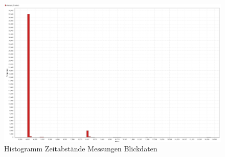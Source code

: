 \begin{figure}[H]
	\noindent \begin{centering}
		\includegraphics[width=15cm]{pics/HistogrammZeitenBlickdateien.png}
		\par\end{centering}
	\caption{\label{fig:HistogrammZeitenBlickdateien}Histogramm Zeitabst\"ande Messungen Blickdaten \cite{BilderExplorativeDatenanalyseBoersch}}
\end{figure}